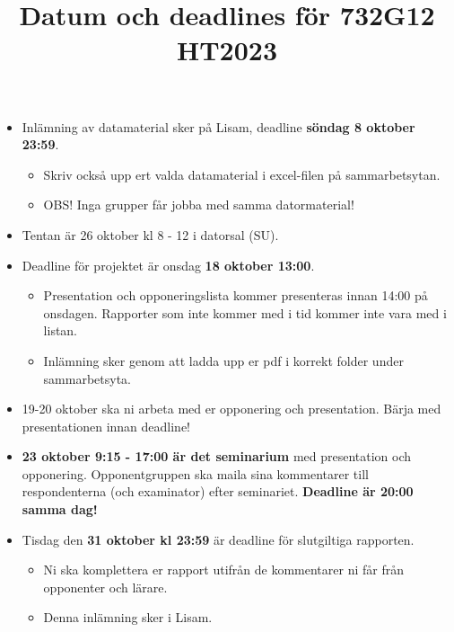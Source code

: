 \documentclass[a4paper]{article}
\title{Datum och deadlines för 732G12 HT2023}
\author{}
\date{}
\begin{document}
\maketitle
\thispagestyle{fancy}

\begin{itemize}
    \item Inlämning av datamaterial sker på Lisam, deadline \textbf{söndag 8 oktober 23:59}.
    \begin{itemize}
        \item Skriv också upp ert valda datamaterial i excel-filen på sammarbetsytan.
        \item OBS! Inga grupper får jobba med samma datormaterial!
    \end{itemize}
    \item Tentan är 26 oktober kl 8 - 12 i datorsal (SU).
    \item Deadline för projektet är onsdag \textbf{18 oktober 13:00}.
    \begin{itemize}
        \item Presentation och opponeringslista kommer presenteras innan 14:00 på onsdagen. Rapporter som inte kommer med i tid kommer inte vara med i listan.
        \item Inlämning sker genom att ladda upp er pdf i korrekt folder under sammarbetsyta.
    \end{itemize}
    \item 19-20 oktober ska ni arbeta med er opponering och presentation. Bärja med presentationen innan deadline!
    \item \textbf{23 oktober 9:15 - 17:00 är det seminarium} med presentation och opponering. Opponentgruppen ska maila sina kommentarer till respondenterna (och examinator) efter seminariet. \textbf{Deadline är 20:00 samma dag!}
    \item Tisdag den \textbf{31 oktober kl 23:59} är deadline för slutgiltiga rapporten.
    \begin{itemize}
        \item Ni ska komplettera er rapport utifrån de kommentarer ni får från opponenter och lärare.
        \item Denna inlämning sker i Lisam.
    \end{itemize}
\end{itemize}
\end{document}
